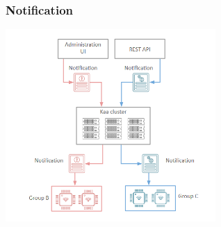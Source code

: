 \documentclass{beamer}
\begin{document}
\begin{frame}
	\frametitle{Notification}
	\centering\includegraphics[width=8cm]{figs/notification.png}
\end{frame}
\end{document}
